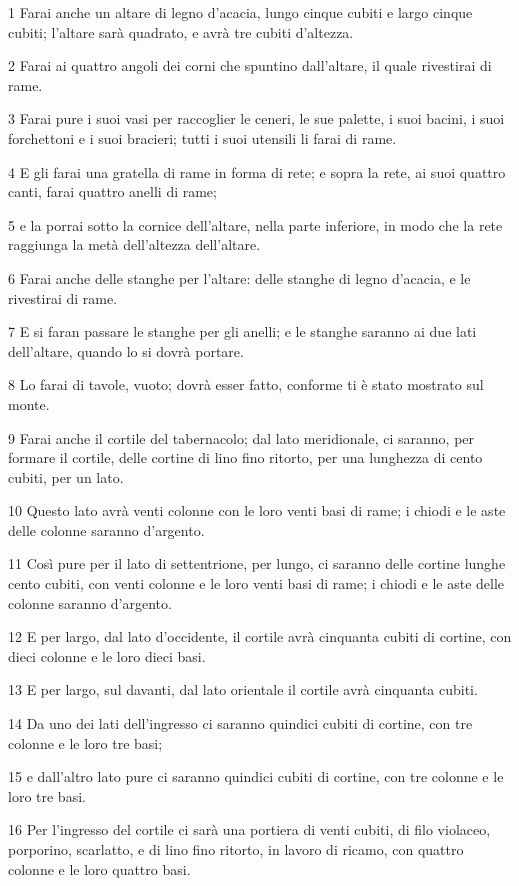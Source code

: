 \par 1 Farai anche un altare di legno d'acacia, lungo cinque cubiti e largo cinque cubiti; l'altare sarà quadrato, e avrà tre cubiti d'altezza.
\par 2 Farai ai quattro angoli dei corni che spuntino dall'altare, il quale rivestirai di rame.
\par 3 Farai pure i suoi vasi per raccoglier le ceneri, le sue palette, i suoi bacini, i suoi forchettoni e i suoi bracieri; tutti i suoi utensili li farai di rame.
\par 4 E gli farai una gratella di rame in forma di rete; e sopra la rete, ai suoi quattro canti, farai quattro anelli di rame;
\par 5 e la porrai sotto la cornice dell'altare, nella parte inferiore, in modo che la rete raggiunga la metà dell'altezza dell'altare.
\par 6 Farai anche delle stanghe per l'altare: delle stanghe di legno d'acacia, e le rivestirai di rame.
\par 7 E si faran passare le stanghe per gli anelli; e le stanghe saranno ai due lati dell'altare, quando lo si dovrà portare.
\par 8 Lo farai di tavole, vuoto; dovrà esser fatto, conforme ti è stato mostrato sul monte.
\par 9 Farai anche il cortile del tabernacolo; dal lato meridionale, ci saranno, per formare il cortile, delle cortine di lino fino ritorto, per una lunghezza di cento cubiti, per un lato.
\par 10 Questo lato avrà venti colonne con le loro venti basi di rame; i chiodi e le aste delle colonne saranno d'argento.
\par 11 Così pure per il lato di settentrione, per lungo, ci saranno delle cortine lunghe cento cubiti, con venti colonne e le loro venti basi di rame; i chiodi e le aste delle colonne saranno d'argento.
\par 12 E per largo, dal lato d'occidente, il cortile avrà cinquanta cubiti di cortine, con dieci colonne e le loro dieci basi.
\par 13 E per largo, sul davanti, dal lato orientale il cortile avrà cinquanta cubiti.
\par 14 Da uno dei lati dell'ingresso ci saranno quindici cubiti di cortine, con tre colonne e le loro tre basi;
\par 15 e dall'altro lato pure ci saranno quindici cubiti di cortine, con tre colonne e le loro tre basi.
\par 16 Per l'ingresso del cortile ci sarà una portiera di venti cubiti, di filo violaceo, porporino, scarlatto, e di lino fino ritorto, in lavoro di ricamo, con quattro colonne e le loro quattro basi.
